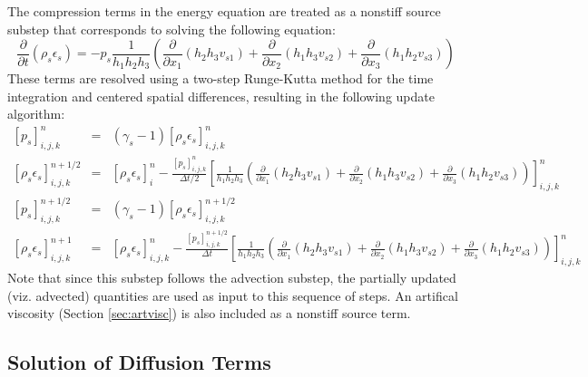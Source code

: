 \documentclass[11pt,letterpaper]{article}
\begin{document}
The compression terms in the energy equation are treated as a nonstiff source substep that corresponds to solving the following equation:
\begin{equation}
\frac{\partial}{\partial t} \left( \rho_s \epsilon_s \right) = -p_s \frac{1}{h_1 h_2 h_3} \left( \frac{\partial}{\partial x_1} \left( h_2 h_3 v_{s1} \right) + \frac{\partial}{\partial x_2} \left( h_1 h_3 v_{s2} \right) + \frac{\partial}{\partial x_3} \left( h_1 h_2 v_{s3} \right) \right)
\end{equation}
These terms are resolved using a two-step Runge-Kutta method for the time integration and centered spatial differences, resulting in the following update algorithm:
\begin{eqnarray}
\left[p_s \right]_{i,j,k}^{n} &=& \left( \gamma_s - 1 \right) \left[ \rho_s \epsilon_s \right]_{i,j,k}^{n} \nonumber \\
\left[ \rho_s \epsilon_s \right]_{i,j,k}^{n+1/2} &=& \left[ \rho_s \epsilon_s \right]_i^{n} - \frac{ \left[ p_s \right]_{i,j,k}^n }{\Delta t / 2} \left[ \frac{1}{h_1 h_2 h_3} \left( \frac{\partial}{\partial x_1} \left( h_2 h_3 v_{s1} \right) + \frac{\partial}{\partial x_2} \left( h_1 h_3 v_{s2} \right) + \frac{\partial}{\partial x_3} \left( h_1 h_2 v_{s3} \right) \right) \right]_{i,j,k}^n \nonumber \\
\left[ p_s \right]_{i,j,k}^{n+1/2} &=& \left( \gamma_s - 1 \right) \left[ \rho_s \epsilon_s \right]_{i,j,k}^{n+1/2} \nonumber \\
\left[ \rho_s \epsilon_s \right]_{i,j,k}^{n+1} &=& \left[ \rho_s \epsilon_s \right]_{i,j,k}^{n} - \frac{ \left[ p_s \right]_{i,j,k}^{n+1/2} }{\Delta t} \left[ \frac{1}{h_1 h_2 h_3} \left( \frac{\partial}{\partial x_1} \left( h_2 h_3 v_{s1} \right) + \frac{\partial}{\partial x_2} \left( h_1 h_3 v_{s2} \right) + \frac{\partial}{\partial x_3} \left( h_1 h_2 v_{s3} \right) \right) \right]_{i,j,k}^n \nonumber
\end{eqnarray}
Note that since this substep follows the advection substep, the partially updated (viz. advected) quantities are used as input to this sequence of steps.  An artifical viscosity (Section \ref{sec:artvisc}) is also included as a nonstiff source term.  


\subsection{Solution of Diffusion Terms} \label{sec:numdiff}
\end{document}
